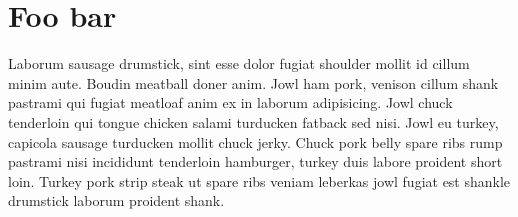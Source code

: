 \chapter{Foo bar}
\label{cha:foo_bar}

Laborum sausage drumstick, sint esse dolor fugiat shoulder mollit id cillum minim aute. Boudin meatball doner anim. Jowl ham pork, venison cillum shank pastrami qui fugiat meatloaf anim ex in laborum adipisicing. Jowl chuck tenderloin qui tongue chicken salami turducken fatback sed nisi. Jowl eu turkey, capicola sausage turducken mollit chuck jerky. Chuck pork belly spare ribs rump pastrami nisi incididunt tenderloin hamburger, turkey duis labore proident short loin. Turkey pork strip steak ut spare ribs veniam leberkas jowl fugiat est shankle drumstick laborum proident shank.
